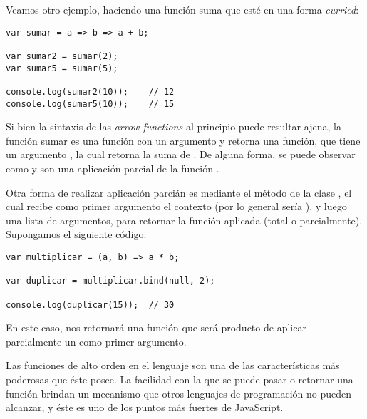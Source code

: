 Veamos otro ejemplo, haciendo una función suma que esté en una forma \textit{curried}:

\begin{lstlisting}[title={Función suma \textit{curried}}]
var sumar = a => b => a + b;

var sumar2 = sumar(2);
var sumar5 = sumar(5);

console.log(sumar2(10));	// 12
console.log(sumar5(10));	// 15
\end{lstlisting}

Si bien la sintaxis de las \textit{arrow functions} al principio puede resultar ajena, la función sumar es una función con un argumento  y retorna una función, que tiene un argumento , la cual retorna la suma de . De alguna forma, se puede observar como  y  son una aplicación parcial de la función .

Otra forma de realizar aplicación parcián es mediante el método  de la clase , el cual recibe como primer argumento el contexto (por lo general sería ), y luego una lista de argumentos, para retornar la función aplicada (total o parcialmente). Supongamos el siguiente código:

\begin{lstlisting}[title={Aplicación parcial usando \code{bind}}]
var multiplicar = (a, b) => a * b;

var duplicar = multiplicar.bind(null, 2);

console.log(duplicar(15));	// 30
\end{lstlisting}

En este caso,  nos retornará una función que será producto de aplicar parcialmente un  como primer argumento. 

Las funciones de alto orden en el lenguaje son una de las características más poderosas que éste posee. La facilidad con la que se puede pasar o retornar una función brindan un mecanismo que otros lenguajes de programación no pueden alcanzar, y éste es uno de los puntos más fuertes de JavaScript.

